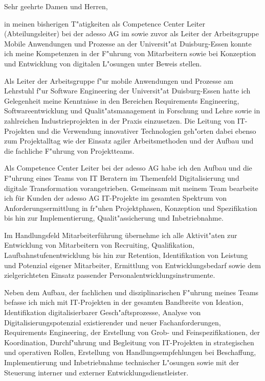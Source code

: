\documentclass[10pt,a4paper]{dinbrief}
\date{\today}
\begin{document}
 
\begin{letter}  
{%
	
}
\subject{\bf Motivationsschreiben}
\opening{Sehr geehrte Damen und Herren,}
in meinen bisherigen T"atigkeiten als Competence Center Leiter (Abteilungsleiter) bei der adesso AG im sowie zuvor als Leiter der Arbeitsgruppe Mobile Anwendungen und Prozesse an der Universit"at Duisburg-Essen konnte ich meine Kompetenzen in der F"uhrung von Mitarbeitern sowie bei Konzeption und Entwicklung von digitalen L"osungen unter Beweis stellen.

Als Leiter der Arbeitsgruppe f"ur mobile Anwendungen und Prozesse am Lehrstuhl f"ur Software Engineering der Universit"at Duisburg-Essen hatte ich Gelegenheit meine Kenntnisse in den Bereichen Requirements Engineering, Softwareentwicklung und Qualit"atsmanagement in Forschung und Lehre sowie in zahlreichen Industrieprojekten in der Praxis einzusetzen. Die Leitung von IT-Projekten und die Verwendung innovativer Technologien geh"orten dabei ebenso zum Projektalltag wie der Einsatz agiler Arbeitsmethoden und der Aufbau und die fachliche F"uhrung von Projektteams.

Als Competence Center Leiter bei der adesso AG habe ich den Aufbau und die F"uhrung eines Teams von IT Beratern im Themenfeld Digitalisierung und digitale Transformation vorangetrieben. Gemeinsam mit meinem Team bearbeite ich für Kunden der adesso AG IT-Projekte im gesamten Spektrum von Anforderungsermittlung in fr"uhen Projektphasen, Konzeption und Spezifikation bis hin zur Implementierung, Qualit"assicherung und Inbetriebnahme.

Im Handlungsfeld Mitarbeiterführung übernehme ich alle Aktivit"aten zur Entwicklung von Mitarbeitern von Recruiting, Qualifikation, Laufbahnstufenentwicklung bis hin zur Retention, Identifikation von Leistung und Potenzial eigener Mitarbeiter, Ermittlung von Entwicklungsbedarf sowie dem zielgerichteten Einsatz passender Personalentwicklungsinstrumente.

Neben dem Aufbau, der fachlichen und disziplinarischen F"uhrung meines Teams befasse ich mich  mit IT-Projekten in der gesamten Bandbreite von Ideation, Identifikation digitalisierbarer Gesch"afts\-prozesse, Analyse von Digitalisierungspotenzial existierender und neuer Fachanforderungen, Requirements Engineering, der Erstellung von Grob- und Feinspezifikationen, der Koordination, Durchf"uhrung und Begleitung von IT-Projekten in strategischen und operativen Rollen, Erstellung von Handlungsempfehlungen bei Beschaffung, Implementierung und Inbetriebnahme technischer L"osungen sowie mit der Steuerung interner und externer Entwicklungsdienstleister.\clearpage


\end{letter}
\end{document}
